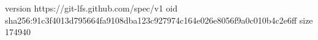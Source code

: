 version https://git-lfs.github.com/spec/v1
oid sha256:91c3f4013d795664fa9108dba123c927974c164e026e8056f9a0c010b4c2e6ff
size 174940
